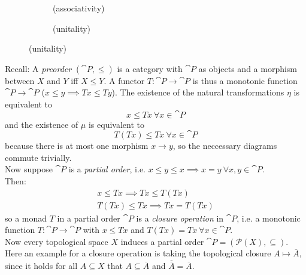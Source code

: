 \begin{definition}[monad]
\begin{figure}[H]
\centering
\begin{subfigure}{0.4\textwidth}
\centering
\caption*{(associativity)}
\end{subfigure}
\hspace{2em}
\begin{subfigure}{0.4\textwidth}
\centering
\caption*{(unitality)}
\end{subfigure}
\end{figure}

\end{definition}
\begin{example}[preorder]
Recall: A \textit{preorder} $(\cat{P},\le)$ is a category with $\cat{P}$ as objects and 
a morphism between $X$ and $Y$ iff $X \le Y$.
A functor $T\colon \cat{P} \to \cat{P}$ is thus a monotonic function $\cat{P}\to \cat{P}$
($x \le y \implies Tx\le Ty$).
The existence of the natural transformations $\eta$ is equivalent to
\[x \le Tx \ \forall x \in \cat{P}\]
and the existence of $\mu$ is equivalent to
\[T(Tx) \le Tx \ \forall x \in \cat{P}\] 
because there is at most one morphism $x \to y$, so the neccessary diagrams commute trivially.\\
Now suppose $\cat{P}$ is a \textit{partial order}, i.e. $x \le y \le x \implies x = y \ \forall x,y \in \cat{P}$. \\
Then:
\begin{align*}
    x \le Tx \implies Tx \le T(Tx) \\
    T(Tx) \le Tx \implies Tx = T(Tx)
\end{align*}
so a monad $T$ in a partial order $\cat{P}$ is a \textit{closure operation} in $\cat{P}$, i.e. 
a monotonic function $T \colon \cat{P} \to \cat{P}$ 
with $x \le Tx$ and $T(Tx)=Tx \ \forall x \in \cat{P}.$ \\
Now every topological space $X$ induces a partial order $\cat{P} = (\mathscr{P}(X),\subseteq)$.
Here an example for a closure operation is taking the topological closure $A \mapsto \overline{A}$,
since it holds for all $A \subseteq X$ that $A \subseteq \overline{A}$ and
$\overline{\overline{A}} = \overline{A}$.
\end{example}
